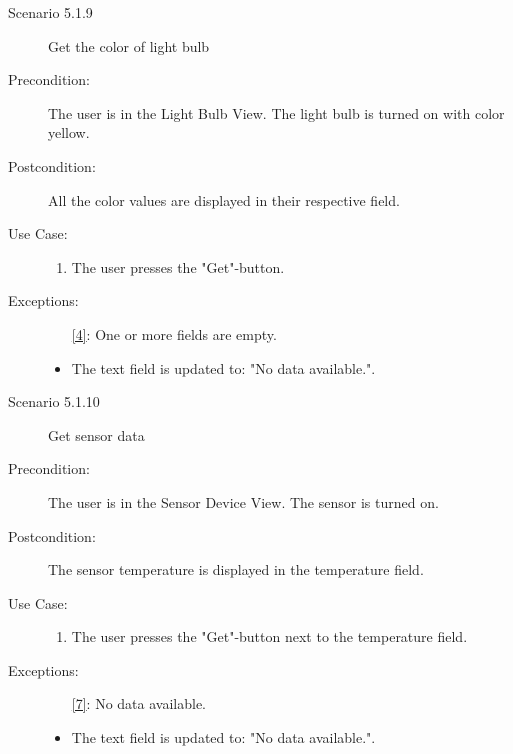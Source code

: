 \documentclass[a4paper]{article}
\begin{document}
\begin{description}
\item[]

\item[Scenario 5.1.9] Get the color of light bulb
\item[Precondition:] The user is in the Light Bulb View. The light bulb is turned on with color yellow.
\item[Postcondition:] All the color values are displayed in their respective field.
\item[Use Case:]\mbox{}
\begin{enumerate}
\item  \label{4} The user presses the "Get"-button.
\end{enumerate}

\item[Exceptions:]
\item[]

\begin{itemize}
\item [\ref{4}:] One or more fields are empty.
\item The text field is updated to: "No data available.".
\end{itemize}

\item[]

\item[Scenario 5.1.10] Get sensor data
\item[Precondition:] The user is in the Sensor Device View. The sensor is turned on.
\item[Postcondition:] The sensor temperature is displayed in the temperature field.
\item[Use Case:]\mbox{}
\begin{enumerate}
\item \label{7} The user presses the "Get"-button next to the temperature field.

\end{enumerate}

\item[Exceptions:]
\item[]

\begin{itemize}
\item [\ref{7}:] No data available.
\item The text field is updated to: "No data available.".
\end{itemize}

\item[]


\end{description}
\end{document}
